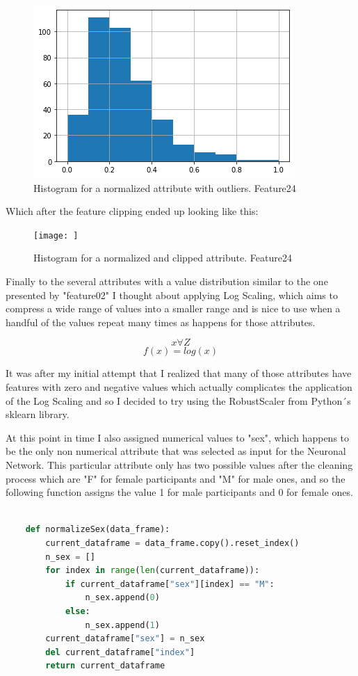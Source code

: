 \documentclass[12pt, a4paper]{article}
\begin{document}
	\begin{figure}[h]
		\label{Feature24N}
		\includegraphics{img/plots/feature24N.png}
		\caption{Histogram for a normalized attribute with outliers. Feature24}
	\end{figure}

	Which after the feature clipping ended up looking like this:
	
	\begin{figure}[H]
		\label{Feature24NC}
		\texttt{[image: ]}
		\caption{Histogram for a normalized and clipped attribute. Feature24}
	\end{figure}

	Finally to the several attributes with a value distribution similar to the one presented by "feature02" I thought about applying Log Scaling, which aims to compress a wide range of values into a smaller range and is nice to use when a handful of the values repeat many times as happens for those attributes.
	
	\[ x \forall Z \]
	\[ f(x) = log(x) \]
	
	It was after my initial attempt that I realized that many of those attributes have features with zero and negative values which actually complicates the application of the Log Scaling and so I decided to try using the RobustScaler from Python´s sklearn library.
	
	At this point in time I also assigned numerical values to "sex", which happens to be the only non numerical attribute  that was selected as input for the Neuronal Network. This particular attribute only has two possible values after the cleaning process which are "F" for female participants and "M" for male ones, and so the following function assigns the value 1 for male participants and 0 for female ones.
	
	\vspace{5mm}
	
	\begin{lstlisting}[language=Python]
		
	def normalizeSex(data_frame):
		current_dataframe = data_frame.copy().reset_index()
		n_sex = []
		for index in range(len(current_dataframe)):
			if current_dataframe["sex"][index] == "M":
				n_sex.append(0)
			else:
				n_sex.append(1)
		current_dataframe["sex"] = n_sex
		del current_dataframe["index"]
		return current_dataframe
	\end{lstlisting}
	
\end{document}

